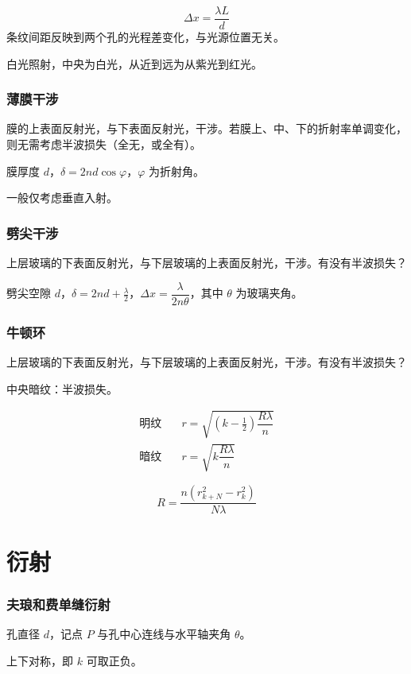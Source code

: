 \documentclass[12pt, a4paper, UTF8, openany]{ctexbook}
\begin{document}
        $$\Delta x = \frac{\lambda L}{d}$$
        条纹间距反映到两个孔的光程差变化，与光源位置无关。

        白光照射，中央为白光，从近到远为从紫光到红光。

        \subsubsection{薄膜干涉}
        膜的上表面反射光，与下表面反射光，干涉。若膜上、中、下的折射率单调变化，则无需考虑半波损失（全无，或全有）。

        膜厚度 $d$，$\delta = 2 n d \cos\varphi$，$\varphi$ 为折射角。

        一般仅考虑垂直入射。

        \subsubsection{劈尖干涉}
        上层玻璃的下表面反射光，与下层玻璃的上表面反射光，干涉。有没有半波损失？

        劈尖空隙 $d$，$\delta = 2nd + \frac{\lambda}{2}$，$\Delta x = \dfrac{\lambda}{2 n \theta}$，其中 $\theta$ 为玻璃夹角。

        \subsubsection{牛顿环}
        上层玻璃的下表面反射光，与下层玻璃的上表面反射光，干涉。有没有半波损失？

        中央暗纹：半波损失。

        $$\begin{aligned}
            \text{明纹} \quad &r = \sqrt{(k - \frac{1}{2}) \dfrac{R\lambda}{n}} \\
            \text{暗纹} \quad &r = \sqrt{k \dfrac{R\lambda}{n}}
        \end{aligned}$$

        $$R = \frac{n(r_{k + N}^2 - r_k^2)}{N \lambda}$$

    \section{衍射}
        \subsubsection{夫琅和费单缝衍射}
        孔直径 $d$，记点 $P$ 与孔中心连线与水平轴夹角 $\theta$。

        上下对称，即 $k$ 可取正负。
\end{document}
